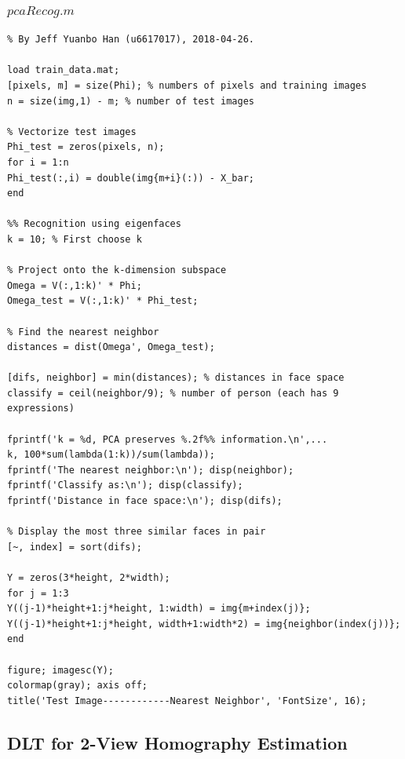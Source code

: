 \documentclass{article}
\theoremstyle{plain} \newtheorem{prop}{Proposition}
\begin{document}
\subsubsection{$pcaRecog.m$}
\label{code-3}
\begin{lstlisting}
% By Jeff Yuanbo Han (u6617017), 2018-04-26.

load train_data.mat;
[pixels, m] = size(Phi); % numbers of pixels and training images
n = size(img,1) - m; % number of test images

% Vectorize test images
Phi_test = zeros(pixels, n);
for i = 1:n
Phi_test(:,i) = double(img{m+i}(:)) - X_bar;
end

%% Recognition using eigenfaces
k = 10; % First choose k

% Project onto the k-dimension subspace
Omega = V(:,1:k)' * Phi;
Omega_test = V(:,1:k)' * Phi_test;

% Find the nearest neighbor
distances = dist(Omega', Omega_test);

[difs, neighbor] = min(distances); % distances in face space
classify = ceil(neighbor/9); % number of person (each has 9 expressions)

fprintf('k = %d, PCA preserves %.2f%% information.\n',...
k, 100*sum(lambda(1:k))/sum(lambda));
fprintf('The nearest neighbor:\n'); disp(neighbor);
fprintf('Classify as:\n'); disp(classify);
fprintf('Distance in face space:\n'); disp(difs);

% Display the most three similar faces in pair
[~, index] = sort(difs);

Y = zeros(3*height, 2*width);
for j = 1:3
Y((j-1)*height+1:j*height, 1:width) = img{m+index(j)};
Y((j-1)*height+1:j*height, width+1:width*2) = img{neighbor(index(j))};
end

figure; imagesc(Y);
colormap(gray); axis off;
title('Test Image------------Nearest Neighbor', 'FontSize', 16);

\end{lstlisting}

\subsection{DLT for 2-View Homography Estimation}
\end{document}
